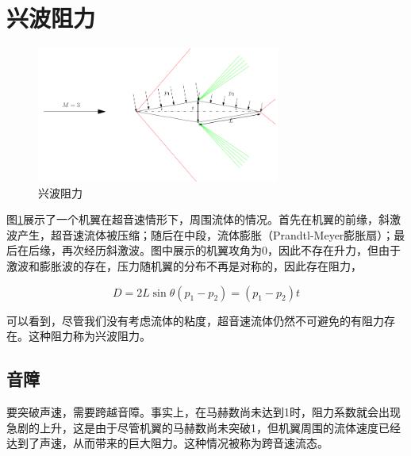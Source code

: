 \section{兴波阻力}

\begin{figure}[!ht]
    \centering
    \includegraphics[width=8cm]{figures/22.png}
    \caption{兴波阻力}
    \label{22}
\end{figure}

图\ref{22}展示了一个机翼在超音速情形下，周围流体的情况。首先在机翼的前缘，斜激波产生，超音速流体被压缩；随后在中段，流体膨胀（Prandtl-Meyer膨胀扇）；最后在后缘，再次经历斜激波。图中展示的机翼攻角为0，因此不存在升力，但由于激波和膨胀波的存在，压力随机翼的分布不再是对称的，因此存在阻力，

\begin{equation*}
    D=2 L \sin \theta\left(p_{1}-p_{2}\right)=\left(p_{1}-p_{2}\right) t
\end{equation*}

可以看到，尽管我们没有考虑流体的粘度，超音速流体仍然不可避免的有阻力存在。这种阻力称为兴波阻力。

\subsection{音障}

要突破声速，需要跨越音障。事实上，在马赫数尚未达到1时，阻力系数就会出现急剧的上升，这是由于尽管机翼的马赫数尚未突破1，但机翼周围的流体速度已经达到了声速，从而带来的巨大阻力。这种情况被称为跨音速流态。


